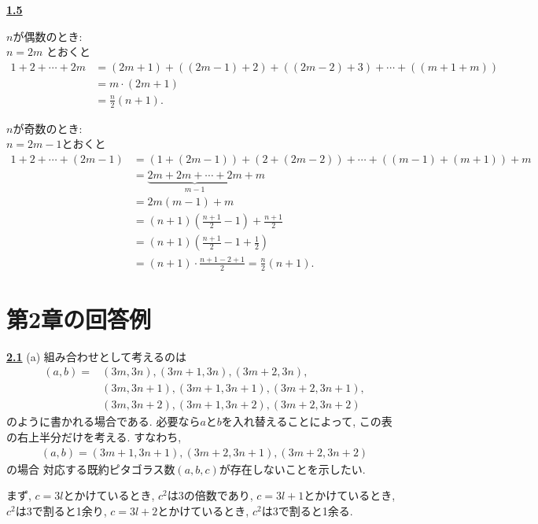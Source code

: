 \documentclass{jarticle}
\newcommand{\cnt}[1]{\noindent \underline{\textbf{#1}}}
\begin{document}
\cnt{1.5} %

\noindent $n$が偶数のとき: \\
$n = 2m$ とおくと
\begin{align*}
1 + 2 + \cdots + 2m
  &= (2m + 1) + ((2m - 1) + 2) + ((2m - 2) + 3) + \cdots + ((m + 1 + m)) \\
  &= m \cdot (2m+1) \\
  &= \frac{n}{2}(n+1).
\end{align*}

\noindent $n$が奇数のとき: \\
$n = 2m - 1$とおくと
\begin{align*}
1 + 2 + \cdots + (2m - 1)
  &= (1 + (2m - 1)) + (2 + (2m - 2)) + \cdots + ((m - 1) + (m + 1)) + m \\
  &= \underbrace{2m + 2m + \cdots + 2m}_{m-1} + m \\
  &= 2m(m-1) + m \\
  &= (n+1)(\frac{n+1}{2} - 1) + \frac{n+1}{2} \\
  &= (n+1)(\frac{n+1}{2} - 1 + \frac{1}{2}) \\
  &= (n+1) \cdot \frac{n+1 - 2 + 1}{2} = \frac{n}{2}(n+1).
\end{align*}



\section{第2章の回答例} %

\noindent \cnt{2.1} \indent %
\noindent (a) 組み合わせとして考えるのは
\begin{align*}
(a, b) =& (3m, 3n), (3m+1, 3n), (3m+2, 3n), \\
        & (3m, 3n+1), (3m+1, 3n+1), (3m+2, 3n+1), \\
        & (3m, 3n+2), (3m+1, 3n+2), (3m+2, 3n+2)
\end{align*}
のように書かれる場合である.
必要なら$a$と$b$を入れ替えることによって, この表の右上半分だけを考える.
すなわち,
\begin{align*}
(a, b) = (3m+1, 3n+1), (3m+2, 3n+1), (3m+2, 3n+2)
\end{align*}
の場合 対応する既約ピタゴラス数$(a, b, c)$が存在しないことを示したい.

まず, $c = 3l$とかけているとき, $c^2$は3の倍数であり,
$c = 3l+1$とかけているとき, $c^2$は3で割ると1余り,
$c = 3l+2$とかけているとき, $c^2$は3で割ると1余る.
\end{document}
